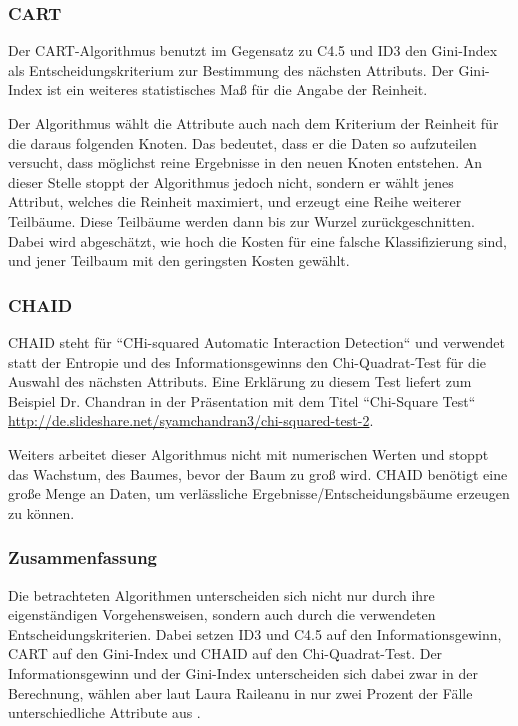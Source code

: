 \subsubsection{CART}
Der CART-Algorithmus benutzt im Gegensatz zu C4.5 und ID3 den Gini-Index als Entscheidungskriterium zur Bestimmung des nächsten Attributs. \cite{rapidminer_rapidminer_2015} Der Gini-Index ist ein weiteres statistisches Maß für die Angabe der Reinheit. 

Der Algorithmus wählt die Attribute auch nach dem Kriterium der Reinheit für die daraus folgenden Knoten. Das bedeutet, dass er die Daten so aufzuteilen versucht, dass möglichst reine Ergebnisse in den neuen Knoten entstehen. An dieser Stelle stoppt der Algorithmus jedoch nicht, sondern er wählt jenes Attribut, welches die Reinheit maximiert, und erzeugt  eine Reihe weiterer Teilbäume. Diese Teilbäume werden dann bis zur Wurzel zurückgeschnitten. Dabei wird abgeschätzt, wie hoch die Kosten für eine falsche Klassifizierung sind, und jener Teilbaum mit den geringsten Kosten gewählt. \cite{wei-yin_loh_classification_2008}

\subsubsection{CHAID}
CHAID steht für ``CHi-squared Automatic Interaction Detection`` und verwendet statt der Entropie und des Informationsgewinns den Chi-Quadrat-Test für die Auswahl des nächsten Attributs. Eine Erklärung zu diesem Test liefert zum Beispiel Dr. Chandran in der Präsentation mit dem Titel ``Chi-Square Test``  \url{http://de.slideshare.net/syamchandran3/chi-squared-test-2}. \cite{rapidminer_rapidminer_2015}

Weiters arbeitet dieser Algorithmus nicht mit numerischen Werten und stoppt das Wachstum, des Baumes, bevor der Baum zu groß wird. CHAID benötigt eine große Menge an Daten, um verlässliche Ergebnisse/Entscheidungsbäume erzeugen zu können.\cite{rapidminer_rapidminer_2015}

\subsubsection{Zusammenfassung}
Die betrachteten Algorithmen unterscheiden sich nicht nur durch ihre eigenständigen Vorgehensweisen, sondern auch durch die verwendeten Entscheidungskriterien. Dabei setzen ID3 und C4.5 auf den Informationsgewinn, CART auf den Gini-Index und CHAID auf den Chi-Quadrat-Test. Der Informationsgewinn und der Gini-Index unterscheiden sich dabei zwar in der Berechnung, wählen aber laut Laura Raileanu in nur zwei Prozent der Fälle unterschiedliche Attribute aus \cite{laura_raileanu_2004}. 

